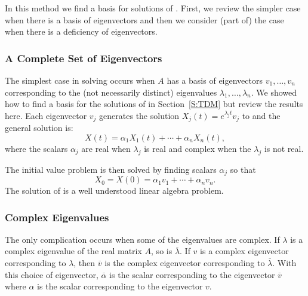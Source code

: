 \documentclass{ximera}
\begin{document}
In this method we find a basis for solutions of .  First, we 
review the simpler case when there is a basis of eigenvectors and then we 
consider (part of) the case when there is a deficiency of eigenvectors.

\subsubsection*{A Complete Set of Eigenvectors}

The simplest case in solving  occurs when $A$ has a basis of 
eigenvectors $v_1,\ldots,v_n$ corresponding to the (not necessarily distinct) 
eigenvalues $\lambda_1,\ldots,\lambda_n$.  We showed how to find a basis for
the solutions of  in Section~\ref{S:TDM} but review the results
here.  Each eigenvector $v_j$ generates the solution 
$X_j(t)=e^{\lambda_j t}v_j$ to  and the general solution is:
\begin{equation} \label{E:gensolns}
X(t) = \alpha_1 X_1(t) + \cdots + \alpha_nX_n(t),
\end{equation}
where the scalars $\alpha_j$ are real when $\lambda_j$ is real and complex
when the $\lambda_j$ is not real.  

The initial value problem is then solved 
by finding scalars $\alpha_j$ so that
\begin{equation}  \label{E:gensolnsic}
X_0 = X(0) =\alpha_1v_1 + \cdots + \alpha_nv_n.
\end{equation}
The solution of  is a well understood linear algebra 
problem.   

\subsubsection*{Complex Eigenvalues}

The only complication occurs when some of the eigenvalues are complex. 
If $\lambda$ is a complex eigenvalue of the real matrix $A$, so is 
$\overline{\lambda}$.  If $v$ is a complex eigenvector corresponding to 
$\lambda$, then $\overline{v}$ is the complex eigenvector corresponding to 
$\overline{\lambda}$.  With this choice of eigenvector, $\overline{\alpha}$ 
is the scalar corresponding to the eigenvector $\overline{v}$ where $\alpha$
is the scalar corresponding to the eigenvector $v$.
\end{document}
